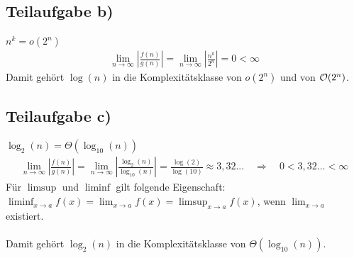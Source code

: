 \documentclass{llncs}
\begin{document}
\subsection*{Teilaufgabe b)}
$n^k = o(2^n)$\\
\begin{align*}
\lim_{n \to \infty}{\left|\frac{f(n)}{g(n)}\right|}=\lim_{n \to \infty}{\left|\frac{n^k}{2^n}\right|}=0 < \infty
\end{align*}
Damit gehört $\log(n)$ in die Komplexitätsklasse von $o(2^n)$ und von $\mathcal{O}(2^n)$.
\subsection*{Teilaufgabe c)}
$\log_2(n) = \Theta(\log_{10}(n))$
\begin{align*}
\lim_{n \to \infty}{\left|\frac{f(n)}{g(n)}\right|}=\lim_{n \to \infty}{\left|\frac{\log_2(n)}{\log_{10}(n)}\right|}=\frac{\log(2)}{\log(10)} \approx 3,32... \quad\Longrightarrow\quad
0<3,32...<\infty
\end{align*}
Für $\limsup$ und $\liminf$ gilt folgende Eigenschaft: \\
$\liminf_{x \to a}f(x) = \lim_{x \to a}f(x)=\limsup_{x \to a} f(x)$, wenn $\lim_{x \to a}$ existiert.\\\\
Damit gehört $\log_2(n)$ in die Komplexitätsklasse von $\Theta(\log_{10}(n))$.
\end{document}
